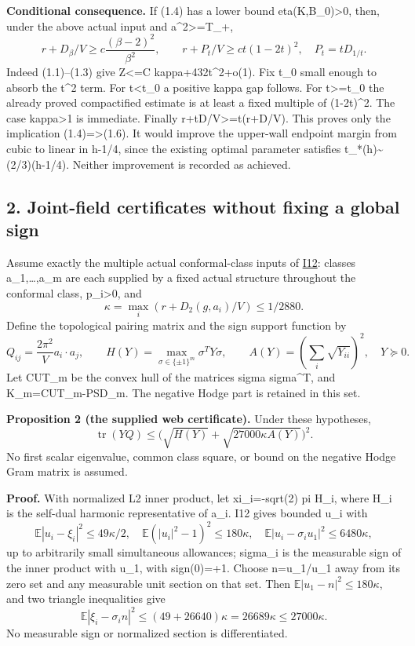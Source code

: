 \documentclass[
  10pt,
]{article}
\begin{document}
\textbf{Conditional consequence.} If (1.4) has a lower bound
eta(K,B\_0)\textgreater0, then, under the above actual input and
a\^{}2\textgreater=T\_+, \[
 r+D_\beta/V\ge c\frac{(\beta-2)^2}{\beta^2},\qquad
 r+P_t/V\ge ct(1-2t)^2,\quad P_t=tD_{1/t}.               \tag{1.6}
\] Indeed (1.1)--(1.3) give Z\textless=C kappa+432t\^{}2+o(1). Fix t\_0
small enough to absorb the t\^{}2 term. For t\textless t\_0 a positive
kappa gap follows. For t\textgreater=t\_0 the already proved
compactified estimate is at least a fixed multiple of (1-2t)\^{}2. The
case kappa\textgreater1 is immediate. Finally
r+tD/V\textgreater=t(r+D/V). This proves only the implication
(1.4)=\textgreater(1.6). It would improve the upper-wall endpoint margin
from cubic to linear in h-1/4, since the existing optimal parameter
satisfies t\_*(h)\textasciitilde(2/3)(h-1/4). Neither improvement is
recorded as achieved.

\hypertarget{joint-field-certificates-without-fixing-a-global-sign}{%
\subsection{2. Joint-field certificates without fixing a global
sign}\label{joint-field-certificates-without-fixing-a-global-sign}}

Assume exactly the multiple actual conformal-class inputs of
\href{../mathematics/current/line1_period_inertia.md}{I12}: classes
a\_1,\ldots,a\_m are each supplied by a fixed actual structure
throughout the conformal class, p\_i\textgreater0, and \[
 \kappa=\max_i(r+D_2(g,a_i)/V)\le1/2880.
\] Define the topological pairing matrix and the sign support function
by \[
 Q_{ij}=\frac{2\pi^2}{V}a_i\cdot a_j,\qquad
 H(Y)=\max_{\sigma\in\{\pm1\}^m}\sigma^T Y\sigma,\qquad
 A(Y)=\left(\sum_i\sqrt{Y_{ii}}\right)^2,
 \quad Y\succeq0.
\] Let CUT\_m be the convex hull of the matrices sigma sigma\^{}T, and
K\_m=CUT\_m-PSD\_m. The negative Hodge part is retained in this set.

\textbf{Proposition 2 (the supplied web certificate).} Under these
hypotheses, \[
 \operatorname{tr}(YQ)\le
       \bigl(\sqrt{H(Y)}+\sqrt{27000\kappa A(Y)}\bigr)^2.   \tag{2.1}
\] No first scalar eigenvalue, common class square, or bound on the
negative Hodge Gram matrix is assumed.

\textbf{Proof.} With normalized L2 inner product, let xi\_i=-sqrt(2) pi
H\_i, where H\_i is the self-dual harmonic representative of a\_i. I12
gives bounded u\_i with \[
 \mathbb E|u_i-\xi_i|^2\le49\kappa/2,
 \quad\mathbb E(|u_i|^2-1)^2\le180\kappa,
 \quad\mathbb E|u_i-\sigma_i u_1|^2\le6480\kappa,
\] up to arbitrarily small simultaneous allowances; sigma\_i is the
measurable sign of the inner product with u\_1, with sign(0)=+1. Choose
n=u\_1/\textbar u\_1\textbar{} away from its zero set and any measurable
unit section on that set. Then \(\mathbb E|u_1-n|^2\le180\kappa\), and
two triangle inequalities give \[
 \mathbb E|\xi_i-\sigma_i n|^2
       \le (49+26640)\kappa=26689\kappa\le27000\kappa.    \tag{2.2}
\] No measurable sign or normalized section is differentiated.
\end{document}
